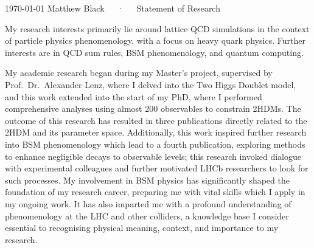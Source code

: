 \documentclass[11pt, a4paper]{awesome-cv}
\begin{document}
\makecvheader[R]

\makecvfooter
  {\today}
  {Matthew Black~~~·~~~Statement of Research}
  {}


\begin{cvletter}

My research interests primarily lie around lattice QCD simulations in the context of particle physics phenomenology, with a focus on heavy quark physics.
Further interests are in QCD sum rules, BSM phenomenology, and quantum computing.

My academic research began during my Master's project, supervised by Prof.~Dr.~Alexander Lenz, where I delved into the Two Higgs Doublet model, and this work extended into the start of my PhD, where I performed comprehensive analyses using almost 200 observables to constrain 2HDMs.
The outcome of this research has resulted in three publications directly related to the 2HDM and its parameter space. 
Additionally, this work inspired further research into BSM phenomenology which lead to a fourth publication, exploring methods to enhance negligible decays to observable levels; this research invoked dialogue with experimental colleagues and further motivated LHCb researchers to look for such processes.
My involvement in BSM physics has significantly shaped the foundation of my research career, preparing me with vital skills which I apply in my ongoing work. 
It has also imparted me with a profound understanding of phenomenology at the LHC and other colliders, a knowledge base I consider essential to recognising physical meaning, context, and importance to my research.


\end{cvletter}
\end{document}
